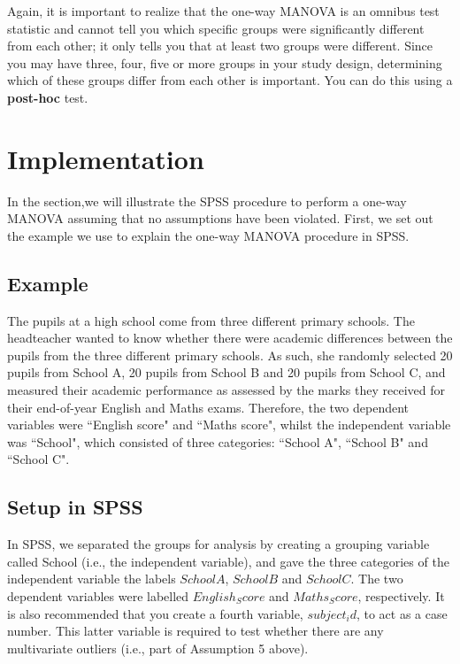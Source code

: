 \documentclass[a4paper,12pt]{article}
\begin{document}
Again, it is important to realize that the one-way MANOVA is an omnibus test statistic and cannot tell you which specific groups were significantly different from each other; it only tells you that at least two groups were different. Since you may have three, four, five or more groups in your study design, determining which of these groups differ from each other is important. You can do this using a \textbf{post-hoc} test.


\section{Implementation}
In the section,we will illustrate the SPSS procedure to perform a one-way MANOVA assuming that no assumptions have been violated. First, we set out the example we use to explain the one-way MANOVA procedure in SPSS.



\subsection{Example}
The pupils at a high school come from three different primary schools. The headteacher wanted to know whether there were academic differences between the pupils from the three different primary schools. As such, she randomly selected 20 pupils from School A, 20 pupils from School B and 20 pupils from School C, and measured their academic performance as assessed by the marks they received for their end-of-year English and Maths exams. Therefore, the two dependent variables were ``English score" and ``Maths score", whilst the independent variable was ``School", which consisted of three categories: ``School A", ``School B" and ``School C".


\subsection{Setup in SPSS}
In SPSS, we separated the groups for analysis by creating a grouping variable called School (i.e., the independent variable), and gave the three categories of the independent variable the labels $School A$, $School B$ and $School C$. The two dependent variables were labelled $English_Score$ and $Maths_Score$, respectively. It is also recommended that you create a fourth variable, $subject_id$, to act as a case number. This latter variable is required to test whether there are any multivariate outliers (i.e., part of Assumption 5 above).

\end{document}
